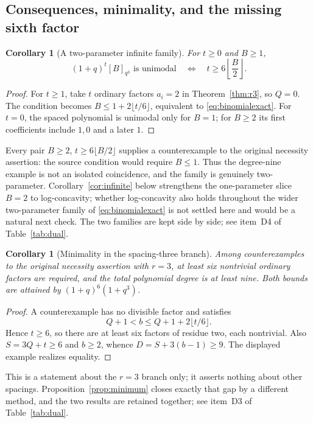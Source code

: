 \documentclass[11pt]{article}
\theoremstyle{research}
\newtheorem{corollary}[theorem]{Corollary}
\theoremstyle{definition}
\newcommand{\qir}[2]{[#1]_{q^{#2}}}
\numberwithin{equation}{section}
\begin{document}
\subsection{Consequences, minimality, and the missing sixth factor}
\label{sec:r3-consequences}
\begin{corollary}[A two-parameter infinite family]\label{cor:binomialexact}
For $t\ge0$ and $B\ge1$,
\begin{equation}\label{eq:binomialexact}
 (1+q)^t\qir B3\text{ is unimodal}
 \quad\Longleftrightarrow\quad
 t\ge6\left\lfloor\frac B2\right\rfloor.
\end{equation}
\end{corollary}
\begin{proof}
For $t\ge1$, take $t$ ordinary factors $a_i=2$ in
Theorem~\ref{thm:r3}, so $Q=0$. The condition becomes
$B\le1+2\lfloor t/6\rfloor$, equivalent to \eqref{eq:binomialexact}.
For $t=0$, the spaced polynomial is unimodal only for $B=1$;
for $B\ge2$ its first coefficients include $1,0$ and a later $1$.
\end{proof}

Every pair $B\ge2$, $t\ge6\lfloor B/2\rfloor$ supplies a counterexample
to the original necessity assertion: the source condition would require
$B\le1$. Thus the degree-nine example is not an isolated coincidence, and
the family is genuinely two-parameter.
Corollary~\ref{cor:infinite} below strengthens the one-parameter slice
$B=2$ to log-concavity; whether log-concavity also holds throughout the
wider two-parameter family of \eqref{eq:binomialexact} is not settled
here and would be a natural next check. The two families are kept side by
side; see item~D4 of Table~\ref{tab:dual}.

\begin{corollary}[Minimality in the spacing-three branch]\label{cor:minimal}
Among counterexamples to the original necessity assertion with $r=3$,
at least six nontrivial ordinary factors are required, and the total
polynomial degree is at least nine. Both bounds are attained by
$(1+q)^6(1+q^3)$.
\end{corollary}
\begin{proof}
A counterexample has no divisible factor and satisfies
\[
 Q+1<b\le Q+1+2\lfloor t/6\rfloor.
\]
Hence $t\ge6$, so there are at least six factors of residue two, each
nontrivial. Also $S=3Q+t\ge6$ and $b\ge2$, whence
$D=S+3(b-1)\ge9$. The displayed example realizes equality.
\end{proof}

This is a statement about the $r=3$ branch only; it asserts nothing about
other spacings. Proposition~\ref{prop:minimum} closes exactly that gap by
a different method, and the two results are retained together; see item~D3
of Table~\ref{tab:dual}.
\end{document}
